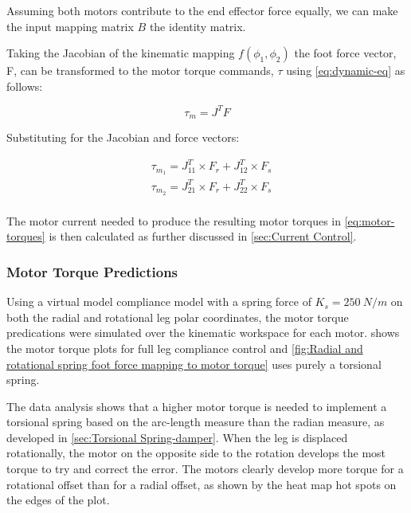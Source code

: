 Assuming both motors contribute to the end effector force equally, we can make the input mapping matrix $B$ the identity matrix.

Taking the Jacobian of the kinematic mapping $f(\phi_1, \phi_2)$ the foot force vector, F, can be transformed to the motor torque commands, $\tau$ using \cref{eq:dynamic-eq} as follows:

\begin{equation}
\tau_m = J^TF
\end{equation}

Substituting for the Jacobian and force vectors:

\begin{equation} \label{eq:motor-torques}
\begin{aligned}
& \tau_{m_1} = J^T_{11}\times F_r + J^T_{12}\times F_s \\
& \tau_{m_2} = J^T_{21}\times F_r + J^T_{22}\times F_s \\
\end{aligned}
\end{equation}

The motor current needed to produce the resulting motor torques in \cref{eq:motor-torques} is then calculated as further discussed in \cref{sec:Current Control}.

\subsubsection{Motor Torque Predictions}
\label{sec:Motor Torque Predictions}

Using a virtual model compliance model with a spring force of $K_s = 250\ N/m$ on both the radial and rotational leg polar coordinates, the motor torque predications were simulated over the kinematic workspace for each motor.  shows the motor torque plots for full leg compliance control and \cref{fig:Radial and rotational spring foot force mapping to motor torque} uses purely a torsional spring.

The data analysis shows that a higher motor torque is needed to implement a torsional spring based on the arc-length measure than the radian measure, as developed in \cref{sec:Torsional Spring-damper}. When the leg is displaced rotationally, the motor on the opposite side to the rotation develops the most torque to try and correct the error. The motors clearly develop more torque for a rotational offset than for a radial offset, as shown by the heat map hot spots on the edges of the plot.

